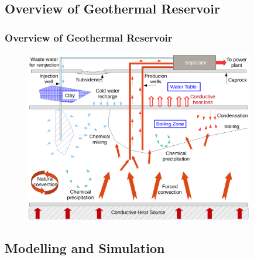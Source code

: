\documentclass[10pt,compress]{beamer}
\begin{document}
\subsection{Overview of Geothermal Reservoir}

\begin{frame}
 \frametitle{Overview of Geothermal Reservoir}
   \begin{figure}%
     \includegraphics[width=12.cm, height=7.5cm, clip]{./Pics/GeothermalOverviewDiagram}
   \end{figure}  
\end{frame}


\subsection{Modelling and Simulation}
\end{document}
